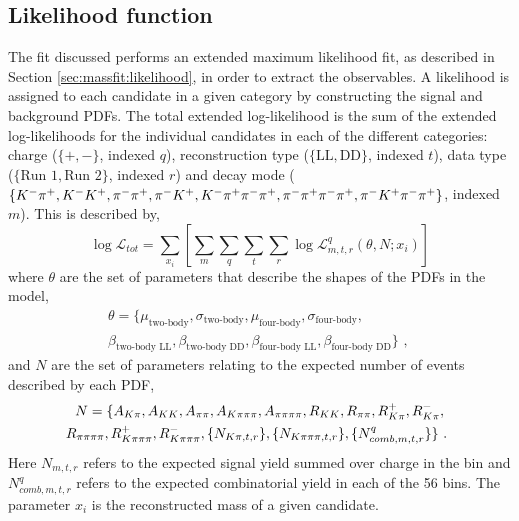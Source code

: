 \subsection{Likelihood function}
\label{sec:cpfit:likelihood}

The \CP fit discussed performs an extended maximum likelihood fit, as described in Section \ref{sec:massfit:likelihood}, in order to extract the \CP observables. A likelihood is assigned to each candidate in a given category by constructing the signal and background PDFs. The total extended log-likelihood is the sum of the extended log-likelihoods for the individual candidates in each of the different categories: \B charge ($\{+,-\}$, indexed $q$), \KS reconstruction type ($\{\text{LL},\text{DD}\}$, indexed $t$), data type ($\{\text{Run 1},\text{Run 2}\}$, indexed $r$) and \Dz decay mode ($\{{{K}^-}{{\pi}^+},{{K}^-}{{K}^+},{{\pi}^-}{{\pi}^+},{{\pi}^-}{{K}^+},{{K}^-}{{\pi}^+}{{\pi}^-}{{\pi}^+},{{\pi}^-}{{\pi}^+}{{\pi}^-}{{\pi}^+},{{\pi}^-}{{K}^+}{{\pi}^-}{{\pi}^+}\}$, indexed $m$). This is described by,
\begin{equation}
\log\mathcal{L}_{tot} = \sum_{x_i} \left[ \sum_{m}\sum_{q}\sum_{t}\sum_{r} \log{\mathcal{L}}_{m,t,r}^q\left( \theta, N; x_i \right) \right]
\end{equation}
where $\theta$ are the set of parameters that describe the shapes of the PDFs in the model,
\begin{multline}
\theta = \{\mu_\text{two-body}, \sigma_\text{two-body}, \mu_\text{four-body}, \sigma_\text{four-body}, \\ \beta_\text{two-body LL}, \beta_\text{two-body DD}, \beta_\text{four-body LL}, \beta_\text{four-body DD}\} \text{ , }
\end{multline} 
and $N$ are the set of parameters relating to the expected number of events described by each PDF, 
\begin{multline}
N = \{A_{K\pi}, A_{KK}, A_{\pi\pi}, A_{K\pi\pi\pi}, A_{\pi\pi\pi\pi}, R_{KK}, R_{\pi\pi}, R^+_{K\pi}, R^-_{K\pi}, \\ R_{\pi\pi\pi\pi}, R^+_{K\pi\pi\pi}, R^-_{K\pi\pi\pi}, \{N_{K\pi,t,r}\}, \{N_{K\pi\pi\pi,t,r}\}, \{N_{comb,m,t,r}^{q}\}\} \text{ . }
\end{multline}
Here $N_{m,t,r}$ refers to the expected signal yield summed over charge in the bin and $N_{comb,m,t,r}^q$ refers to the expected combinatorial yield in each of the 56 bins. The parameter $x_i$ is  the reconstructed mass of a given candidate.


